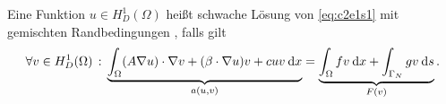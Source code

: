 \documentclass[../skript.tex]{subfiles}
\begin{document}
\begin{definition} %
Eine Funktion $u \in H_D^1(\Omega)$ heißt schwache Lösung von \cref{eq:c2e1s1} mit gemischten Randbedingungen , falls gilt
\begin{equation} %
\label{eq:c2e1s4}
	\forall v \in H_D^1(\Omega) \, : \, \underbrace{ \int_\Omega (A \nabla u) \cdot \nabla v + (\beta \cdot \nabla u) v + cuv \dx }_{a(u, v)} = \underbrace{ \int_\Omega fv \dx + \int_{\Gamma_N} gv \ds }_{F(v)}.
\end{equation}
\end{definition}
\end{document}
